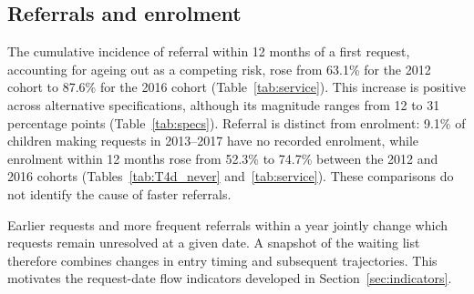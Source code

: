 \subsection{Referrals and enrolment}

The cumulative incidence of referral within 12 months of a first request, accounting for ageing out as a competing risk, rose from 63.1\% for the 2012 cohort to 87.6\% for the 2016 cohort (Table~\ref{tab:service}). This increase is positive across alternative specifications, although its magnitude ranges from 12 to 31 percentage points (Table~\ref{tab:specs}). Referral is distinct from enrolment: 9.1\% of children making requests in 2013--2017 have no recorded enrolment, while enrolment within 12 months rose from 52.3\% to 74.7\% between the 2012 and 2016 cohorts (Tables~\ref{tab:T4d_never} and~\ref{tab:service}). These comparisons do not identify the cause of faster referrals.

Earlier requests and more frequent referrals within a year jointly change which requests remain unresolved at a given date. A snapshot of the waiting list therefore combines changes in entry timing and subsequent trajectories. This motivates the request-date flow indicators developed in Section~\ref{sec:indicators}.
